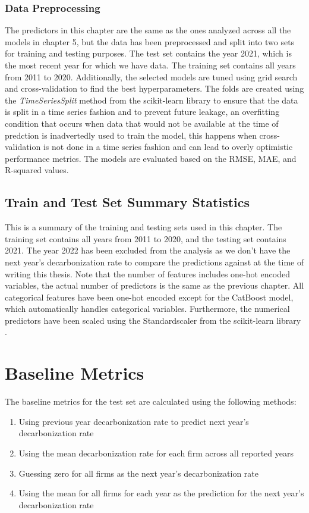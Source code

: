 \subsubsection{Data Preprocessing}
The predictors in this chapter are the same as the ones analyzed across all the models in chapter 5, but the data has been preprocessed and split into two sets for training and testing purposes. The test set contains the year 2021, which is the most recent year for which we have data. The training set contains all years from 2011 to 2020. Additionally, the selected models are tuned using grid search and cross-validation to find the best hyperparameters. The folds are created using the \textit{TimeSeriesSplit} method from the scikit-learn library \cite{scikit-learn} to ensure that the data is split in a time series fashion and to prevent future leakage, an overfitting condition that occurs when data that would not be available at the time of predction is inadvertedly used to train the model, this happens when cross-validation is not done in a time series fashion and can lead to overly optimistic performance metrics. The models are evaluated based on the RMSE, MAE, and R-squared values. 

\subsection{Train and Test Set Summary Statistics}
This is a summary of the training and testing sets used in this chapter. The training set contains all years from 2011 to 2020, and the testing set contains 2021. The year 2022 has been excluded from the analysis as we don't have the next year's decarbonization rate to compare the predictions against at the time of writing this thesis. Note that the number of features includes one-hot encoded variables, the actual number of predictors is the same as the previous chapter. All categorical features have been one-hot encoded except for the CatBoost model, which automatically handles categorical variables. Furthermore, the numerical predictors have been scaled using the Standardscaler from the scikit-learn library \cite{scikit-learn}.



\section{Baseline Metrics}
The baseline metrics for the test set are calculated using the following methods:
\begin{enumerate}
    \item Using previous year decarbonization rate to predict next year's decarbonization rate
    \item Using the mean decarbonization rate for each firm across all reported years
    \item Guessing zero for all firms as the next year's decarbonization rate
    \item Using the mean for all firms for each year as the prediction for the next year's decarbonization rate
\end{enumerate}

